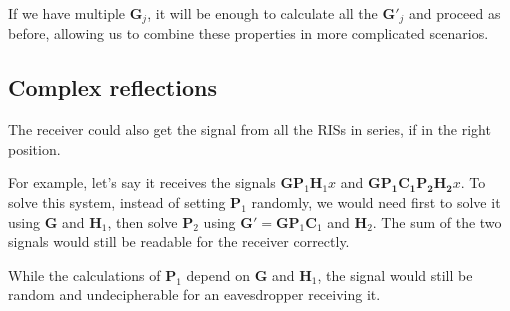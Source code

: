 If we have multiple $\bm{G}_j$, it will be enough to calculate all the $\bm{G}'_j$ and proceed as before, allowing us to combine these properties in more complicated scenarios.

\subsection{Complex reflections}

The receiver could also get the signal from all the RISs in series, if in the right position.

For example, let's say it receives the signals $\bm{GP}_1\bm{H}_1x$ and $\bm{GP_1C_1P_2H_2}x$. To solve this system, instead of setting $\bm{P}_1$ randomly, we would need first to solve it using $\bm{G}$ and $\bm{H}_1$, then solve $\bm{P}_2$ using $\bm{G}'=\bm{GP}_1\bm{C}_1$ and $\bm{H}_2$. The sum of the two signals would still be readable for the receiver correctly.

While the calculations of $\bm{P}_1$ depend on $\bm{G}$ and $\bm{H}_1$, the signal would still be random and undecipherable for an eavesdropper receiving it.
